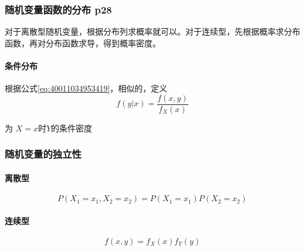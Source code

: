 \subsubsection{随机变量函数的分布 p28}
对于离散型随机变量，根据分布列求概率就可以。对于连续型，先根据概率求分布函数，再对分布函数求导，得到概率密度。

\paragraph{条件分布}

根据公式\ref{eq:40011034953419}，相似的，定义
\begin{equation*}
  f(y|x)=\dfrac{f(x,y)}{f_{X}(x)}
\end{equation*}

为 $X=x$时$Y$的条件密度

\subsubsection{随机变量的独立性}

\paragraph{离散型}
\begin{equation*}
  P(X_{1}=x_{1},X_{2}=x_{2})=P(X_{1}=x_{1})P(X_{2}=x_{2})
\end{equation*}
\paragraph{连续型}
\begin{equation*}
  f(x,y)=f_{X}(x)f_{Y}(y)
\end{equation*}

